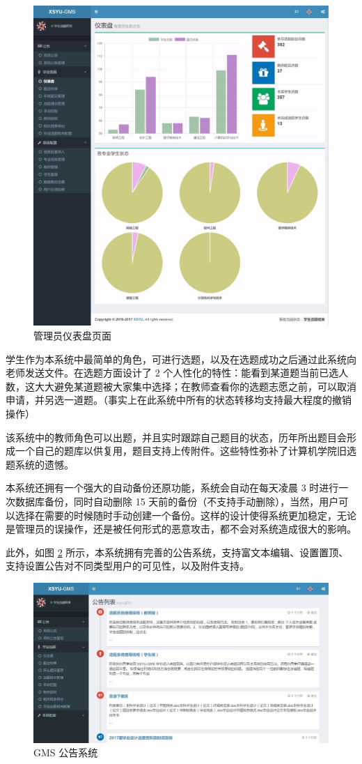 \begin{figure}
	\centering
	\includegraphics[width=0.85\linewidth]{figure/5-2}
	\caption{管理员仪表盘页面}
	\label{admin-panel}
\end{figure}

学生作为本系统中最简单的角色，可进行选题，以及在选题成功之后通过此系统向老师发送文件。在选题方面设计了 2 个人性化的特性：能看到某道题当前已选人数，这大大避免某道题被大家集中选择；在教师查看你的选题志愿之前，可以取消申请，并另选一道题。（事实上在此系统中所有的状态转移均支持最大程度的撤销操作）

该系统中的教师角色可以出题，并且实时跟踪自己题目的状态，历年所出题目会形成一个自己的题库以供复用，题目支持上传附件。这些特性弥补了计算机学院旧选题系统的遗憾。

本系统还拥有一个强大的自动备份还原功能，系统会自动在每天凌晨 3 时进行一次数据库备份，同时自动删除 15 天前的备份（不支持手动删除），当然，用户可以选择在需要的时候随时手动创建一个备份。这样的设计使得系统更加稳定，无论是管理员的误操作，还是被任何形式的恶意攻击，都不会对系统造成很大的影响。

此外，如图 \ref{gms-news} 所示，本系统拥有完善的公告系统，支持富文本编辑、设置置顶、支持设置公告对不同类型用户的可见性，以及附件支持。

\begin{figure}
	\centering
	\includegraphics[width=1\linewidth]{figure/gms-news}
	\caption{GMS 公告系统}
	\label{gms-news}
\end{figure}
